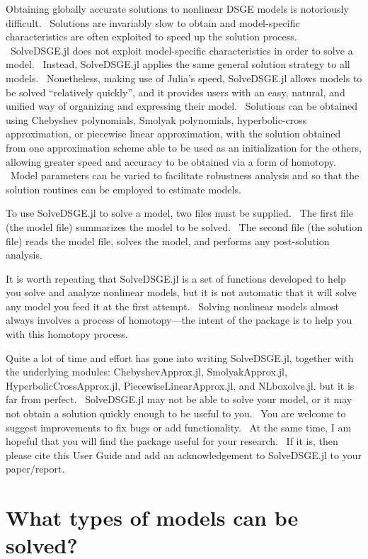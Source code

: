 \documentclass[notitlepage,11pt]{article}
\begin{document}
Obtaining globally accurate solutions to nonlinear DSGE models is
notoriously difficult. \ Solutions are invariably slow to obtain and
model-specific characteristics are often exploited to speed up the solution
process. \ SolveDSGE.jl does not exploit model-specific characteristics in
order to solve a model. \ Instead, SolveDSGE.jl applies the same general
solution strategy to all models. \ Nonetheless, making use of Julia's speed,
SolveDSGE.jl allows models to be solved \textquotedblleft relatively
quickly\textquotedblright , and it provides users with an easy, natural, and
unified way of organizing and expressing their model. \ Solutions can be
obtained using Chebyshev polynomials, Smolyak polynomials, hyperbolic-cross
approximation, or piecewise linear approximation, with the solution obtained
from one approximation scheme able to be used as an initialization for the
others, allowing greater speed and accuracy to be obtained via a form of
homotopy. \ Model parameters can be varied to facilitate robustness analysis
and so that the solution routines can be employed to estimate models. 

To use SolveDSGE.jl to solve a model, two files must be supplied. \ The
first file (the model file) summarizes the model to be solved. \ The second
file (the solution file) reads the model file, solves the model, and
performs any post-solution analysis.

It is worth repeating that SolveDSGE.jl is a set of functions developed to
help you solve and analyze nonlinear models, but it is not automatic that it
will solve any model you feed it at the first attempt. \ Solving nonlinear
models almost always involves a process of homotopy---the intent of the
package is to help you with this homotopy process. 

Quite a lot of time and effort has gone into writing SolveDSGE.jl, together
with the underlying modules: ChebyshevApprox.jl, SmolyakApprox.jl,
HyperbolicCrossApprox.jl, PiecewiseLinearApprox.jl, and NLboxolve.jl. but it
is far from perfect. \ SolveDSGE.jl may not be able to solve your model, or
it may not obtain a solution quickly enough to be useful to you. \ You are
welcome to suggest improvements to fix bugs or add functionality. \ At the
same time, I am hopeful that you will find the package useful for your
research. \ If it is, then please cite this User Guide and add an
acknowledgement to SolveDSGE.jl to your paper/report.

\section{What types of models can be solved?}
\end{document}
